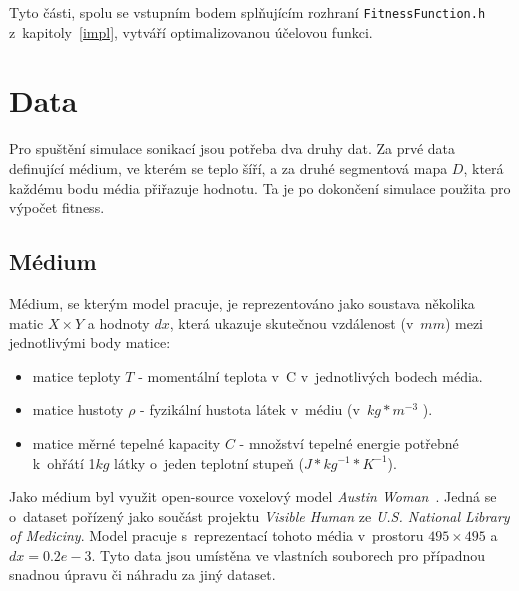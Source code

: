 Tyto části, spolu se vstupním bodem splňujícím rozhraní \texttt{FitnessFunction.h} z~kapitoly~\ref{impl}, vytváří optimalizovanou účelovou funkci.


\section{Data}
Pro spuštění simulace sonikací jsou potřeba dva druhy dat. Za prvé data definující médium, ve kterém se teplo šíří, a za druhé segmentová mapa $D$, která každému bodu média přiřazuje hodnotu. Ta je po dokončení simulace použita pro výpočet fitness.

\subsection{Médium}
Médium, se kterým model pracuje, je reprezentováno jako soustava několika matic $X \times Y$ a hodnoty $dx$, která ukazuje skutečnou vzdálenost (v~$mm$) mezi jednotlivými body matice:
\begin{itemize}
    \item matice teploty $T$ - momentální teplota v~\degree C v~jednotlivých bodech média.
    \item matice hustoty $\rho$ - fyzikální hustota látek v~médiu (v~$kg*m^{-3}$ ).
    \item matice měrné tepelné kapacity $C$ - množství tepelné energie potřebné k~ohřátí 1$kg$ látky o~jeden teplotní stupeň ($J *kg^{-1}*K^{-1}$).
\end{itemize}
Jako médium byl využit open-source voxelový model \emph{Austin Woman}~\cite{austinwoman}. Jedná se o~dataset pořízený jako součást projektu \emph{Visible Human} ze \emph{U.S. National Library of Mediciny}. 
Model pracuje s~reprezentací tohoto média v~prostoru $495 \times 495$ a $dx = 0.2e-3$. Tyto data jsou umístěna ve vlastních souborech pro případnou snadnou úpravu či náhradu za jiný dataset.

